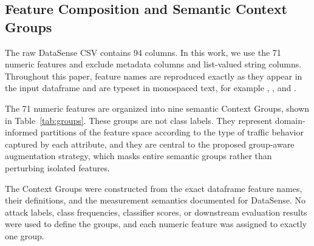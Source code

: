 \subsection{Feature Composition and Semantic Context Groups}
\label{sec:groups}

The raw DataSense CSV contains 94 columns. In this work, we use the 71 numeric features and exclude metadata columns and list-valued string columns. Throughout this paper, feature names are reproduced exactly as they appear in the input dataframe and are typeset in monospaced text, for example , , and .

The 71 numeric features are organized into nine semantic Context Groups, shown in Table~\ref{tab:groups}. These groups are not class labels. They represent domain-informed partitions of the feature space according to the type of traffic behavior captured by each attribute, and they are central to the proposed group-aware augmentation strategy, which masks entire semantic groups rather than perturbing isolated features.

The Context Groups were constructed from the exact dataframe feature names, their definitions, and the measurement semantics documented for DataSense. No attack labels, class frequencies, classifier scores, or downstream evaluation results were used to define the groups, and each numeric feature was assigned to exactly one group. 

